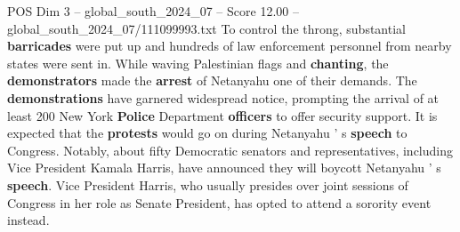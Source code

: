 \begin{textsample}{POS Dim 3 – global\_south\_2024\_07 – Score 12.00 – global\_south\_2024\_07/111099993.txt}
To control the throng, substantial \textbf{barricades} were put up and hundreds of law enforcement personnel from nearby states were sent in.
While waving Palestinian flags and \textbf{chanting}, the \textbf{demonstrators} made the \textbf{arrest} of Netanyahu one of their demands.
The \textbf{demonstrations} have garnered widespread notice, prompting the arrival of at least 200 New York \textbf{Police} Department \textbf{officers} to offer security support.
It is expected that the \textbf{protests} would go on during Netanyahu ' s \textbf{speech} to Congress.
Notably, about fifty Democratic senators and representatives, including Vice President Kamala Harris, have announced they will boycott Netanyahu ' s \textbf{speech}.
Vice President Harris, who usually presides over joint sessions of Congress in her role as Senate President, has opted to attend a sorority event instead.

\end{textsample}
